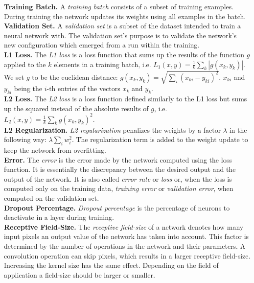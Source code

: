 \noindent\textbf{Training Batch.} A \textit{training batch} consists of a subset of training examples. During training the network updates its weights using all examples in the batch. \\

\noindent\textbf{Validation Set.} A \textit{validation set} is a subset of the dataset intended to train a neural network with. The validation set's purpose is to validate the network's new configuration which emerged from a run within the training. \\

\noindent\textbf{L1 Loss.} The \textit{L1 loss} is a loss function that sums up the results of the function $g$ applied to the $k$ elements in a training batch, i.e. $L_1(x, y) = \frac{1}{k} \sum\limits_k |g(x_k, y_k)|$. We set $g$ to be the euclidean distance: $g(x_k, y_k) = \sqrt{\sum\limits_i (x_{ki} - y_{ki})^2}$, $x_{ki}$ and $y_{ki}$ being the $i$-th entries of the vectors $x_k$ and $y_k$. \\

\noindent\textbf{L2 Loss.} The \textit{L2 loss} is a loss function defined similarly to the L1 loss but sums up the squared instead of the absolute results of $g$, i.e. $L_2(x, y) = \frac{1}{k} \sum\limits_k g(x_k, y_k)^2$. \\

\noindent\textbf{L2 Regularization.} \textit{L2 regularization} penalizes the weights by a factor $\lambda$ in the following way: $\lambda \sum\limits_i w_i^2$. The regularization term is added to the weight update to keep the network from overfitting. \\

\noindent\textbf{Error.} The \textit{error} is the error made by the network computed using the loss function. It is essentially the discrepancy between the desired output and the output of the network. It is also called \textit{error rate} or \textit{loss} or, when the loss is computed only on the training data, \textit{training error} or \textit{validation error}, when computed on the validation set. \\

\noindent\textbf{Dropout Percentage.} \textit{Dropout percentage} is the percentage of neurons to deactivate in a layer during training. \\

\noindent\textbf{Receptive Field-Size.} The \textit{receptive field-size} of a network denotes how many input pixels an output value of the network has taken into account. This factor is determined by the number of operations in the network and their parameters. A convolution operation can skip pixels, which results in a larger receptive field-size. Increasing the kernel size has the same effect. Depending on the field of application a field-size should be larger or smaller.

